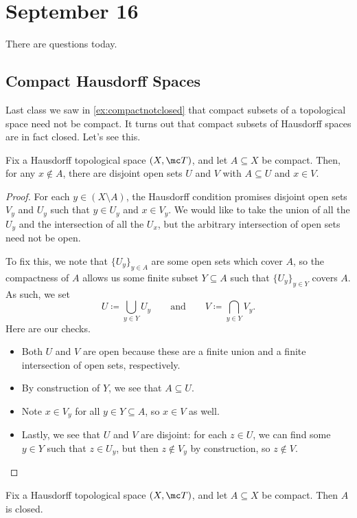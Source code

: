 \documentclass[../notes.tex]{subfiles}
\begin{document}
\section{September 16}

There are questions today.

\subsection{Compact Hausdorff Spaces}
Last class we saw in \autoref{ex:compactnotclosed} that compact subsets of a topological space need not be compact. It turns out that compact subsets of Hausdorff spaces are in fact closed. Let's see this.
\begin{lemma} \label{lem:separationforcompacthaus}
	Fix a Hausdorff topological space $(X,\mc T)$, and let $A\subseteq X$ be compact. Then, for any $x\notin A$, there are disjoint open sets $U$ and $V$ with $A\subseteq U$ and $x\in V$.
\end{lemma}
\begin{proof}
	For each $y\in(X\setminus A)$, the Hausdorff condition promises disjoint open sets $V_y$ and $U_y$ such that $y\in U_y$ and $x\in V_y$. We would like to take the union of all the $U_y$ and the intersection of all the $U_x$, but the arbitrary intersection of open sets need not be open.

	To fix this, we note that $\{U_y\}_{y\in A}$ are some open sets which cover $A$, so the compactness of $A$ allows us some finite subset $Y\subseteq A$ such that $\{U_y\}_{y\in Y}$ covers $A$. As such, we set
	\[U\coloneqq\bigcup_{y\in Y}U_y\qquad\text{and}\qquad V\coloneqq\bigcap_{y\in Y}V_y.\]
	Here are our checks.
	\begin{itemize}
		\item Both $U$ and $V$ are open because these are a finite union and a finite intersection of open sets, respectively.
		\item By construction of $Y$, we see that $A\subseteq U$.
		\item Note $x\in V_y$ for all $y\in Y\subseteq A$, so $x\in V$ as well.
		\item Lastly, we see that $U$ and $V$ are disjoint: for each $z\in U$, we can find some $y\in Y$ such that $z\in U_y$, but then $z\notin V_y$ by construction, so $z\notin V$.
		\qedhere
	\end{itemize}
\end{proof}
\begin{corollary}
	Fix a Hausdorff topological space $(X,\mc T)$, and let $A\subseteq X$ be compact. Then $A$ is closed.
\end{corollary}
\end{document}
